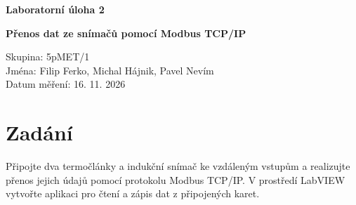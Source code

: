 \begin{center}
\begingroup\sffamily
\vspace*{6.2cm}
{\Large\bfseries Laboratorní úloha 2}
\vspace{2.8cm}

{\Large\bfseries Přenos dat ze snímačů pomocí Modbus TCP/IP}
\endgroup
\end{center}
\vspace{1.5cm}
\noindent
Skupina: 5pMET/1\\[0.8cm]
Jména: Filip Ferko, Michal Hájnik, Pavel Nevím\\[0.8cm]
Datum měření: 16. 11. 2026
\newpage
\section{Zadání}
Připojte dva termočlánky a indukční snímač ke vzdáleným vstupům a realizujte přenos jejich údajů pomocí protokolu Modbus TCP/IP. V prostředí LabVIEW vytvořte aplikaci pro čtení a zápis dat z připojených karet.
\newpage
